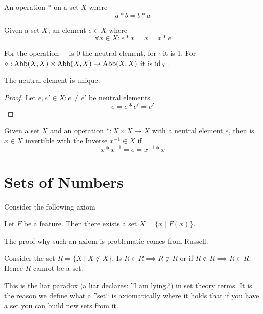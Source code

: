 \begin{definition}
   An operation \(\ast\) on a set \(X\) where
   \[a \ast b = b \ast a\]
\end{definition}

\begin{definition}
   Given a set \(X\), an element \(e \in X\) where
   \[\forall x \in X: e \ast x = x = x \ast e\]
\end{definition}
\begin{example}
   For the operation \(+\) is 0 the neutral element, for \(\cdot\) it is 1.
   For \(\circ: \operatorname{Abb}(X, X) \times \operatorname{Abb}(X, X) \to \operatorname{Abb}(X, X)\) it is \(\operatorname{id}_X\).
\end{example}

\begin{proposition}
   The neutral element is unique.
\end{proposition}
\begin{proof}
   Let \(e, e' \in X: e \neq e'\) be neutral elements
   \[e = e \ast e' = e'\]
\end{proof}

\begin{definition}[Invertible]
   Given a set \(X\) and an operation \(\ast: X \times X \to X\) with a neutral element \(e\), then is \(x \in X\) invertible with the Inverse \(x^{-1} \in X\) if
   \[x \ast x^{-1} = e = x^{-1} \ast x\]
\end{definition}

\section{Sets of Numbers}
Consider the following axiom

Let \(F\) be a feature.
Then there exists a set \(X = \{x \mid F(x)\}\).

The proof why such an axiom is problematic comes from Russell.

Consider the set \(R = \{X \mid X \not\in X\}\).
Is \(R \in R \implies R \not\in R\) or if \(R \not\in R \implies R \in R\).
Hence \(R\) cannot be a set.

This is the liar paradox (a liar declares: ''I am lying.``) in set theory terms.
It is the reason we define what a ''set`` is axiomatically where it holds that if you have a set you can build new sets from it.


